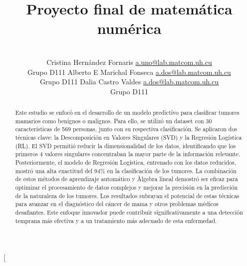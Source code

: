 \documentclass[a4paper,10pt,twocolumn]{article}
\title{Proyecto final de matemática numérica}
\author{\\
\name Cristina Hernández Fornaris \email \href{mailto:a.uno@lab.matcom.uh.cu}{a.uno@lab.matcom.uh.cu}
	\\ \addr Grupo D111 \AND
\name Alberto E Marichal Fonseca \email \href{mailto:a.dos@lab.matcom.uh.cu}{a.dos@lab.matcom.uh.cu}
  \\ \addr Grupo D111\AND
\name Dalia Castro Valdes \email \href{mailto:a.dos@lab.matcom.uh.cu}{a.dos@lab.matcom.uh.cu}
  \\ \addr Grupo D111}
\begin{document}
\twocolumn[

\maketitle


\begin{abstract}

	Este estudio se enfocó en el desarrollo de un modelo predictivo para clasificar tumores mamarios como benignos o malignos. Para ello, se utilizó un dataset con 30 características de 569 personas, junto con su respectiva clasificación. Se aplicaron dos técnicas clave: la Descomposición en Valores Singulares (SVD) y la Regresión Logística (RL). El SVD permitió reducir la dimensionalidad de los datos, identificando que los primeros 4 valores singulares concentraban la mayor parte de la información relevante. Posteriormente, el modelo de Regresión Logística, entrenado con los datos reducidos, mostró una alta exactitud del 94\% en la clasificación de los tumores. La combinación de estos métodos de aprendizaje automático y Àlgebra lineal demostró ser eficaz para optimizar el procesamiento de datos complejos y mejorar la precisión en la predicción de la naturaleza de los tumores. Los resultados subrayan el potencial de estas técnicas para avanzar en el diagnóstico del cáncer de mama y otros problemas médicos desafiantes. Este enfoque innovador puede contribuir significativamente a una detección temprana más efectiva y a un tratamiento más adecuado de esta enfermedad.

\end{abstract}

\vspace{0.5cm}
\end{document}
